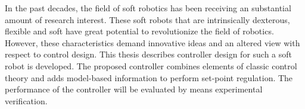In the past decades, the field of soft robotics has been receiving an substantial amount of research interest. These soft robots that are intrinsically dexterous, flexible and soft have great potential to revolutionize the field of robotics. However, these characteristics demand innovative ideas and an altered view with respect to control design. This thesis describes controller design for such a soft robot is developed. The proposed controller combines elements of classic control theory and adds model-based information to perform set-point regulation. The performance of the controller will be evaluated by means experimental verification.